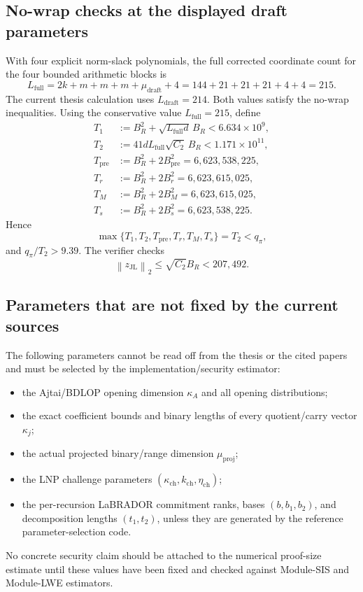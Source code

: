 \documentclass[11pt,a4paper]{article}
\newcommand{\proofmod}{q_{\pi}}
\newcommand{\norm}[1]{\left\lVert #1\right\rVert}
\begin{document}
\subsection{No-wrap checks at the displayed draft parameters}

With four explicit norm-slack polynomials, the full corrected coordinate count
for the four bounded arithmetic blocks is
\[
  L_{\mathrm{full}}
   =2k+m+m+m+\mu_{\mathrm{draft}}+4
   =144+21+21+21+4+4=215.
\]
The current thesis calculation uses \(L_{\mathrm{draft}}=214\).  Both values
satisfy the no-wrap inequalities.  Using the conservative value
\(L_{\mathrm{full}}=215\), define
\begin{align*}
  T_1&:=B_R^2+\sqrt{L_{\mathrm{full}}d}\,B_R
       <6.634\times10^9,\\
  T_2&:=41dL_{\mathrm{full}}\sqrt{C_2}\,B_R
       <1.171\times10^{11},\\
  T_{\mathrm{pre}}&:=B_R^2+2B_{\mathrm{pre}}^2
       =6{,}623{,}538{,}225,\\
  T_r&:=B_R^2+2B_r^2
       =6{,}623{,}615{,}025,\\
  T_M&:=B_R^2+2B_M^2
       =6{,}623{,}615{,}025,\\
  T_s&:=B_R^2+2B_s^2
       =6{,}623{,}538{,}225.
\end{align*}
Hence
\begin{equation}
  \max\{T_1,T_2,T_{\mathrm{pre}},T_r,T_M,T_s\}
  =T_2<\proofmod,
  \label{eq:no-wrap-summary}
\end{equation}
and \(\proofmod/T_2>9.39\).  The verifier checks
\[
  \norm{z_{\mathrm{JL}}}_2\le
  \sqrt{C_2}B_R<207{,}492.
\]

\subsection{Parameters that are not fixed by the current sources}

The following parameters cannot be read off from the thesis or the cited
papers and must be selected by the implementation/security estimator:
\begin{itemize}
  \item the Ajtai/BDLOP opening dimension \(\kappa_A\) and all opening
  distributions;
  \item the exact coefficient bounds and binary lengths of every quotient/carry
  vector \(\kappa_j\);
  \item the actual projected binary/range dimension
  \(\mu_{\mathrm{proj}}\);
  \item the LNP challenge parameters
  \((\kappa_{\mathrm{ch}},k_{\mathrm{ch}},\eta_{\mathrm{ch}})\);
  \item the per-recursion LaBRADOR commitment ranks, bases
  \((b,b_1,b_2)\), and decomposition lengths \((t_1,t_2)\), unless they are
  generated by the reference parameter-selection code.
\end{itemize}
No concrete security claim should be attached to the numerical proof-size
estimate until these values have been fixed and checked against Module-SIS and
Module-LWE estimators.
\end{document}
